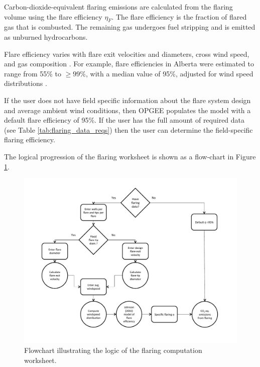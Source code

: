 \documentclass[11pt]{report}
\newcommand{\marg}[1]{{\footnotesize\textit{\textcolor{stanford}{'#1'}}}}
\newcommand{\marginnote}[1]{\marginpar{\marg{#1}}}
\begin{document}
Carbon-dioxide-equivalent flaring emissions are calculated from the flaring volume using the flare efficiency $\eta_F$. \marginnote{Flaring \\ 3.1}The flare efficiency is the fraction of flared gas that is combusted. The remaining gas undergoes fuel stripping and is emitted as unburned hydrocarbons. 

Flare efficiency varies with flare exit velocities and diameters, cross wind speed, and gas composition \cite{Johnson2001, Johnson2008}. For example, flare efficiencies in Alberta were estimated to range from 55\% to $\geq 99$\%, with a median value of 95\%, adjusted for wind speed distributions \cite{Johnson2008}. 

If the user does not have field specific information about the flare system design and average ambient wind conditions,\marginnote{Flaring \\ 1.1} then OPGEE populates the model with a default flare efficiency of 95\%. If the user has the full amount of required data (see Table \ref{tab:flaring_data_reqs}) then the user can determine the field-specific flaring efficiency.

The logical progression of the flaring worksheet is shown as a flow-chart in Figure \ref{fig:flaring_logic}.

\begin{figure}[t]
\includegraphics[width=1\columnwidth]{images/flaring_logic.pdf}
\caption{Flowchart illustrating the logic of the flaring computation worksheet.}
\label{fig:flaring_logic}
\end{figure}
\end{document}
